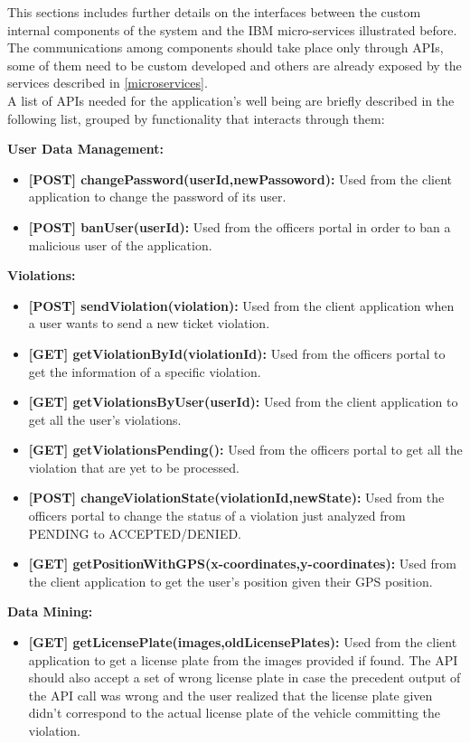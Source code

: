 This sections includes further details on the interfaces between the custom internal components of the system and the IBM micro-services illustrated before. The communications among components should take place only through APIs, some of them need to be custom developed and others are already exposed by the services described in \ref{microservices}.
\\ A list of APIs needed for the application's well being are briefly described in the following list, grouped by functionality that interacts through them:

\textbf{User Data Management:}
\begin{itemize}
	\item \textbf{[POST] changePassword(userId,newPassoword):} Used from the client application to change the password of its user.
	\item \textbf{[POST] banUser(userId):} Used from the officers portal in order to ban a malicious user of the application.
\end{itemize}

\textbf{Violations:}
\begin{itemize}
	\item \textbf{[POST] sendViolation(violation):} Used from the client application when a user wants to send a new ticket violation.
	\item \textbf{[GET] getViolationById(violationId):} Used from the officers portal to get the information of a specific violation.
	\item \textbf{[GET] getViolationsByUser(userId):} Used from the client application to get all the user's violations.
	\item \textbf{[GET]	getViolationsPending():} Used from the officers portal to get all the violation that are yet to be processed.
	\item \textbf{[POST] changeViolationState(violationId,newState):} Used from the officers portal to change the status of a violation just analyzed from PENDING to ACCEPTED/DENIED.
	\item \textbf{[GET] getPositionWithGPS(x-coordinates,y-coordinates):} Used from the client application to get the user's position given their GPS position.
\end{itemize}

\textbf{Data Mining:}
\begin{itemize}
	\item \textbf{[GET] getLicensePlate(images,oldLicensePlates):} Used from the client application to get a license plate from the images provided if found. The API should also accept a set of wrong license plate in case the precedent output of the API call was wrong and the user realized that the license plate given didn't correspond to the actual license plate of the vehicle committing the violation.
\end{itemize}

